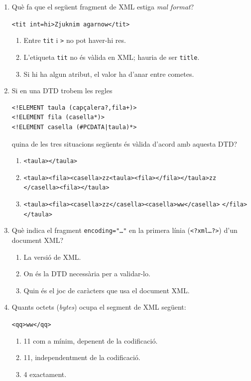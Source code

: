 \begin{enumerate}
\item Què fa que el següent fragment de XML estiga \emph{mal format}?
  \begin{center}\verb|<tit int=hi>Zjuknim agarnow</tit>|\end{center}
  \begin{enumerate}
  \item Entre \verb|tit| i \verb|>| no pot haver-hi res.
  \item L'etiqueta \verb|tit| no és vàlida en XML; hauria de ser
    \verb|title|.
  \item Si hi ha algun atribut, el valor ha d'anar entre cometes.
  \end{enumerate}

\item Si en una DTD trobem les regles
\begin{verbatim}
<!ELEMENT taula (capçalera?,fila+)>
<!ELEMENT fila (casella*)>
<!ELEMENT casella (#PCDATA|taula)*>
\end{verbatim}
  quina de les tres situacions següents és vàlida d'acord amb aquesta
  DTD?
  \begin{enumerate}
  \item \verb|<taula></taula>|
  \item \verb|<taula><fila><casella>zz<taula><fila></fila></taula>zz|
    \verb|</casella><fila></taula>|
  \item \verb|<taula><fila><casella>zz</casella><casella>ww</casella>|
    \verb|</fila></taula>|    
  \end{enumerate}

\item Què indica el fragment \texttt{encoding="\ldots"} en la primera
  línia (\texttt{<?xml\ldots?>}) d'un document XML?
  \begin{enumerate}
  \item La versió de XML.
  \item On és la DTD necessària per a validar-lo.
  \item Quin és el joc de caràcters que usa el document XML.
  \end{enumerate}

\item Quants octets (\emph{bytes}) ocupa el segment de XML
  següent: \begin{center}\verb|<qq>ww</qq>|\end{center}
  \begin{enumerate}
  \item 11 com a mínim, depenent de la codificació.
  \item 11, independentment de la codificació.
  \item 4 exactament.
  \end{enumerate}


\end{enumerate}
